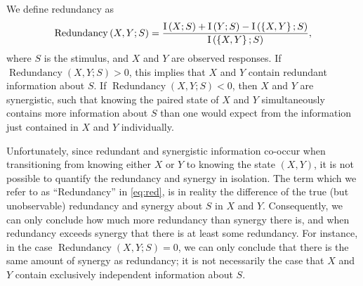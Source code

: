 

We define redundancy as
\begin{equation}
\label{eq:red}
\operatorname{Redundancy}\left(X,Y;S\right)=\frac{
\operatorname{I}\left(X;S\right) + \operatorname{I}\left(Y;S\right) - \operatorname{I}\left(\left\{X,Y\right\};S\right)
}{
\operatorname{I}\left(\left\{X,Y\right\};S\right)
},
\end{equation}
where $S$ is the stimulus, and $X$ and $Y$ are observed responses.
If $\operatorname{Redundancy}\left(X,Y;S\right) > 0$, this implies that $X$ and $Y$ contain redundant information about $S$.
If $\operatorname{Redundancy}\left(X,Y;S\right) < 0$, then $X$ and $Y$ are synergistic, such that knowing the paired state of $X$ and $Y$ simultaneously contains more information about $S$ than one would expect from the information just contained in $X$ and $Y$ individually.

Unfortunately, since redundant and synergistic information co-occur when transitioning from knowing either $X$ or $Y$ to knowing the state $(X,Y)$, it is not possible to quantify the redundancy and synergy in isolation.
The term which we refer to as ``Redundancy'' in \autoref{eq:red}, is in reality the difference of the true (but unobservable) redundancy and synergy about $S$ in $X$ and $Y$.
Consequently, we can only conclude how much more redundancy than synergy there is, and when redundancy exceeds synergy that there is at least some redundancy.
For instance, in the case $\operatorname{Redundancy}\left(X,Y;S\right) = 0$, we can only conclude that there is the same amount of synergy as redundancy; it is not necessarily the case that $X$ and $Y$ contain exclusively independent information about $S$.


